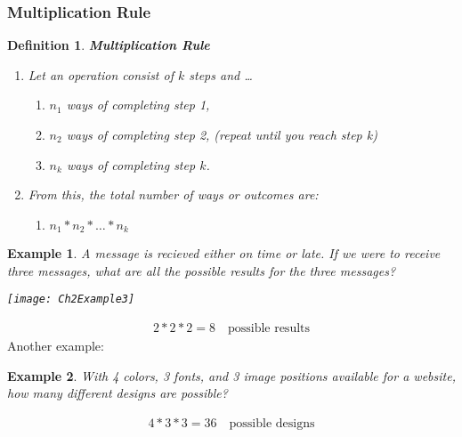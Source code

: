 \documentclass[../IND E 315.tex]{subfiles}
\newtheorem{exmp}{Example}
\newtheorem{defn}{Definition}
\begin{document}
\subsubsection*{Multiplication Rule}
\begin{defn}
    \textbf{Multiplication Rule}
    \begin{enumerate}
        \item Let an operation consist of $k$ steps and \dots 
            \begin{enumerate}
                \item $n_1$ ways of completing step 1, 
                \item $n_2$ ways of completing step 2, (repeat until you reach step k)
                \item $n_k$ ways of completing step $k$.
            \end{enumerate}
        \item From this, the total number of ways or outcomes are:
            \begin{enumerate}
                \item $n_1 * n_2 * \dots * n_k$
            \end{enumerate}
    \end{enumerate}
\end{defn}


\begin{exmp}
    A message is recieved either on time or late. If we were to receive three messages, what are all the possible results for the three messages?
    \begin{center}
        \texttt{[image: Ch2Example3]}
    \end{center}
\end{exmp}
\begin{equation*}
    \begin{aligned}
        2 * 2 * 2 = 8 \quad \text{possible results}
    \end{aligned}
\end{equation*}
Another example:
\begin{exmp}
    With 4 colors, 3 fonts, and 3 image positions available for a website, how many different designs are possible? 
\end{exmp}
\begin{equation*}
    \begin{aligned}
        4 * 3 * 3 = 36 \quad \text{possible designs}
    \end{aligned}
\end{equation*}
\end{document}
